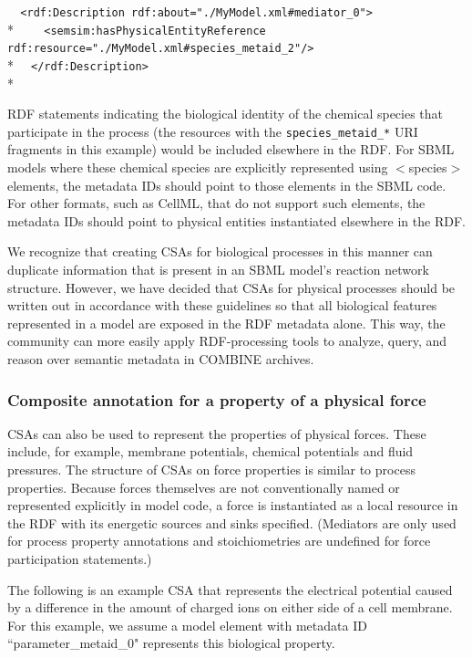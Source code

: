 \documentclass[pdftex,rgb,dvipsnames,svgnames,hyperref,table]{report}
\begin{document}
  
\verb|  <rdf:Description rdf:about="./MyModel.xml#mediator_0">|\\*
\verb|    <semsim:hasPhysicalEntityReference rdf:resource="./MyModel.xml#species_metaid_2"/>|\\*
\verb|  </rdf:Description>|\\*
  
RDF statements indicating the biological identity of the chemical species that participate in the process (the resources with the \texttt{species\_metaid\_*} URI fragments in this example) would be included elsewhere in the RDF. For SBML models where these chemical species are explicitly represented using $<$species$>$ elements, the metadata IDs should point to those elements in the SBML code. For other formats, such as CellML, that do not support such elements, the metadata IDs should point to physical entities instantiated elsewhere in the RDF.

We recognize that creating CSAs for biological processes in this manner can duplicate information that is present in an SBML model's reaction network structure. However, we have decided that CSAs for physical processes should be written out in accordance with these guidelines so that all biological features represented in a model are exposed in the RDF metadata alone. This way, the community can more easily apply RDF-processing tools to analyze, query, and reason over semantic metadata in COMBINE archives.  
  
\subsubsection{Composite annotation for a property of a physical force}
CSAs can also be used to represent the properties of physical forces. These include, for example, membrane potentials, chemical potentials and fluid pressures. The structure of CSAs on force properties is similar to process properties. Because forces themselves are not conventionally named or represented explicitly in model code, a force is instantiated as a local resource in the RDF with its energetic sources and sinks specified. (Mediators are only used for process property annotations and stoichiometries are undefined for force participation statements.)

The following is an example CSA that represents the electrical potential caused by a difference in the amount of charged ions on either side of a cell membrane. For this example, we assume a model element with metadata ID ``parameter\_metaid\_0" represents this biological property. 
\end{document}
